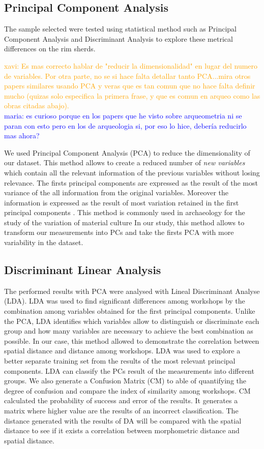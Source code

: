 \documentclass[review]{elsarticle}
\newcommand{\memo}[2]{\textcolor{#1}{#2}}
\newcommand{\xavi}[1]{\memo{orange}{xavi: #1\\}}
\newcommand{\maria}[1]{\memo{blue}{maria: #1\\}}
\begin{document}
\subsection{Principal Component Analysis}

The sample selected were tested using statistical method such as Principal Component Analysis and Discriminant Analysis to explore these metrical differences on the rim sherds. 

\xavi{Es mas correcto hablar de "reducir la dimensionalidad" en lugar del numero de variables. Por otra parte, no se si hace falta detallar tanto PCA...mira otros papers similares usando PCA y veras que es tan comun que no hace falta definir mucho (quizas solo especifica la primera frase, y que es comun en arqueo como las obras citadas abajo).}
\maria{es curioso porque en los papers que he visto sobre arqueometria ni se paran con esto pero en los de arqueologia si, por eso lo hice, debería reducirlo mas ahora?}

We used Principal Component Analysis (PCA) to reduce the dimensionality of our dataset. This method allows to create a reduced number of \textit{new variables} which contain all the relevant information of the previous variables without losing relevance. The firsts principal components are expressed as the result of the most variance of the all information from the original variables. Moreover the information is expressed as the result of most variation retained in the first principal components \citep{jolliffe_principal_2002, shennan_quantifying_1997}. 
This method is commonly used in archaeology for the study of the variation of material culture \citep{li_crossbows_2014, schillinger_differences_2016} 
In our study, this method allows to transform our measurements into PCs and take the firsts PCA with more variability in the dataset.  


\subsection{Discriminant Linear Analysis} 


The performed results with PCA were analysed with Lineal Discriminant Analyse (LDA). LDA was used to find significant differences among workshops by the combination among variables obtained for the first principal components. Unlike the PCA, LDA identifies which variables allow to distinguish or discriminate each group and how many variables are necessary to achieve the best combination as possible. In our case, this method allowed to demonstrate the correlation between spatial distance and distance among workshops. LDA was used to explore a better separate training set from the results of the most relevant principal components. LDA can classify the PCs result of the measurements into different groups.  We also generate a Confusion Matrix (CM) to able of quantifying the degree of confusion and compare the index of similarity among workshops.  CM calculated the probability of success and error of the results. It generates a matrix where higher value are the results of an incorrect classification. The distance generated with the results of DA will be compared with the spatial distance to see if it exists a correlation between morphometric distance and spatial distance. 
\end{document}
